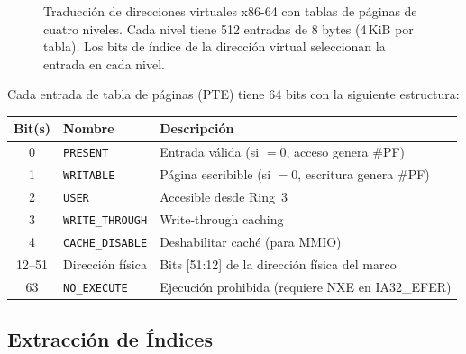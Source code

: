 \documentclass[11pt,twoside,openright]{book}
\theoremstyle{definition}
\theoremstyle{plain}
\theoremstyle{remark}
\begin{document}
\begin{figure}[ht]
\caption{Traducción de direcciones virtuales x86-64 con tablas de páginas de cuatro niveles.
Cada nivel tiene 512 entradas de 8 bytes (4\,KiB por tabla). Los bits de índice de la
dirección virtual seleccionan la entrada en cada nivel.}
\label{fig:page-walk}
\end{figure}

Cada entrada de tabla de páginas (PTE) tiene 64 bits con la siguiente estructura:

\begin{center}
\begin{tabular}{@{}clp{8cm}@{}}
\toprule
\textbf{Bit(s)} & \textbf{Nombre} & \textbf{Descripción} \\
\midrule
0     & \texttt{PRESENT}       & Entrada válida (si $= 0$, acceso genera \#PF) \\
1     & \texttt{WRITABLE}      & Página escribible (si $= 0$, escritura genera \#PF) \\
2     & \texttt{USER}          & Accesible desde Ring~3 \\
3     & \texttt{WRITE\_THROUGH} & Write-through caching \\
4     & \texttt{CACHE\_DISABLE} & Deshabilitar caché (para MMIO) \\
12--51 & Dirección física      & Bits [51:12] de la dirección física del marco \\
63    & \texttt{NO\_EXECUTE}   & Ejecución prohibida (requiere NXE en IA32\_EFER) \\
\bottomrule
\end{tabular}
\end{center}

\subsection{Extracción de Índices}
\end{document}
